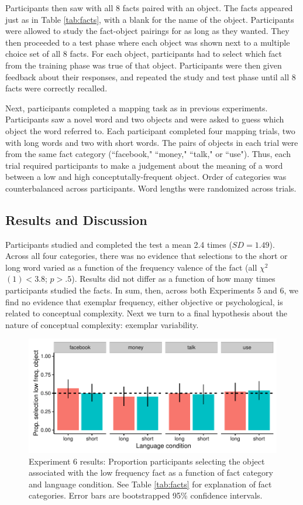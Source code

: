 Participants  then saw with all 8 facts paired with an object. The facts appeared just as in  Table \ref{tab:facts}, with a blank for the name of the object. Participants were allowed to study the fact-object pairings for as long as they wanted. They then proceeded to a test phase where  each object was shown next to a multiple choice set of all 8 facts. For each object, participants had to select which fact from the training phase was true of that object. Participants were then given feedback about their responses, and repeated the study and test phase until all 8 facts were correctly recalled. 

Next, participants completed a mapping task as in previous experiments. Participants saw a novel word and two objects and were asked to guess which object the word referred to. Each participant completed four mapping trials, two with long words and two with short words. The pairs of objects in each trial were from the same fact category (``facebook," ``money," ``talk," or ``use"). Thus, each trial required participants to make a judgement about the meaning of a word between a low  and high conceptutally-frequent object. Order of categories was counterbalanced across participants. Word lengths were randomized across trials. 

\subsection{Results and Discussion}
Participants studied and completed the test a mean 2.4 times ($SD = 1.49$).  Across all four categories, there was no evidence that selections to the short or long word varied as a function of the frequency valence of the fact (all ${\chi}^2$$(1) < 3.8$; $p > .5$). Results did not differ as a function of how many times participants studied the facts. In sum, then, across both Experiments 5 and 6, we find no evidence that exemplar frequency, either objective  or psychological, is related to conceptual complexity. Next we turn to a final hypothesis about the nature of conceptual complexity: exemplar variability.

  \begin{figure}
 \begin{center}
  \includegraphics[width=6in]{figs/fact_plots.pdf}
  \caption{\label{fig:fact_plots} Experiment 6 results: Proportion participants selecting the object associated with the low frequency fact as a function of fact category and language condition. See Table \ref{tab:facts} for explanation of fact categories. Error bars are bootstrapped 95\% confidence intervals.}
 \end{center}
\end{figure}

